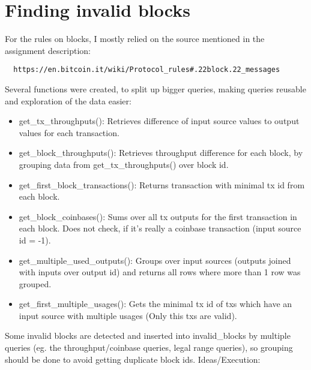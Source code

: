 \documentclass[12pt,a4paper]{article}
\begin{document}
\section{Finding invalid blocks}
For the rules on blocks, I mostly relied on the source mentioned in the assignment description:
\begin{verbatim}
  https://en.bitcoin.it/wiki/Protocol_rules#.22block.22_messages
\end{verbatim}
Several functions were created, to split up bigger queries, making queries reusable and exploration of the data easier:
\begin{itemize}
   \item get\_tx\_throughputs(): Retrieves difference of input source values to output values for each transaction.
   \item get\_block\_throughputs(): Retrieves throughput difference for each block, by grouping data from get\_tx\_throughputs() over block id.
   \item get\_first\_block\_transactions(): Returns transaction with minimal tx id from each block.
   \item get\_block\_coinbases(): Sums over all tx outputs for the first transaction in each block. Does not check, if it's really a coinbase transaction (input source id = -1).
   \item get\_multiple\_used\_outputs(): Groups over input sources (outputs joined with inputs over output id) and returns all rows where more than 1 row was grouped.
   \item get\_first\_multiple\_usages(): Gets the minimal tx id of txs which have an input source with multiple usages (Only this txs are valid).
\end{itemize}
\newline\newline
Some invalid blocks are detected and inserted into invalid\_blocks by multiple queries (eg. the throughput/coinbase queries, legal range queries), so grouping should be done
to avoid getting duplicate block ids.
\newline\newline
Ideas/Execution:
\end{document}
